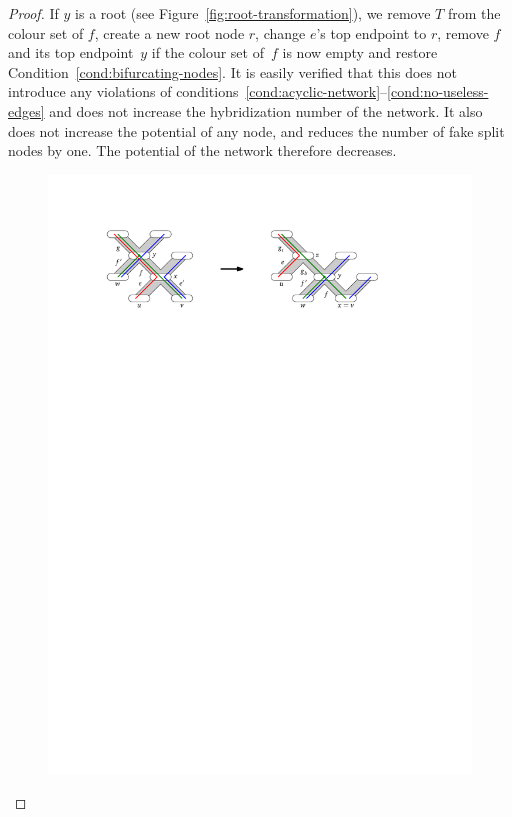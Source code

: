 \begin{proof}
  If $y$ is a root (see Figure~\ref{fig:root-transformation}), we remove $T$   from the colour set of $f$, create a new root   node $r$, change $e$'s top endpoint to $r$, remove $f$ and its top   endpoint{~$y$ if the colour set of~$f$} is now empty and restore Condition~\ref{cond:bifurcating-nodes}.   It is easily verified that this does not introduce any violations of   conditions~\ref{cond:acyclic-network}--\ref{cond:no-useless-edges} and   does not increase the hybridization number of the network.   {It also does not increase the potential of any node, and reduces the number of fake split nodes by one. The} potential of the network therefore decreases.

  \begin{figure}
    \centering
    \includegraphics{../figs/ch4/foreign-split-transformation}

\end{figure}
\end{proof}
